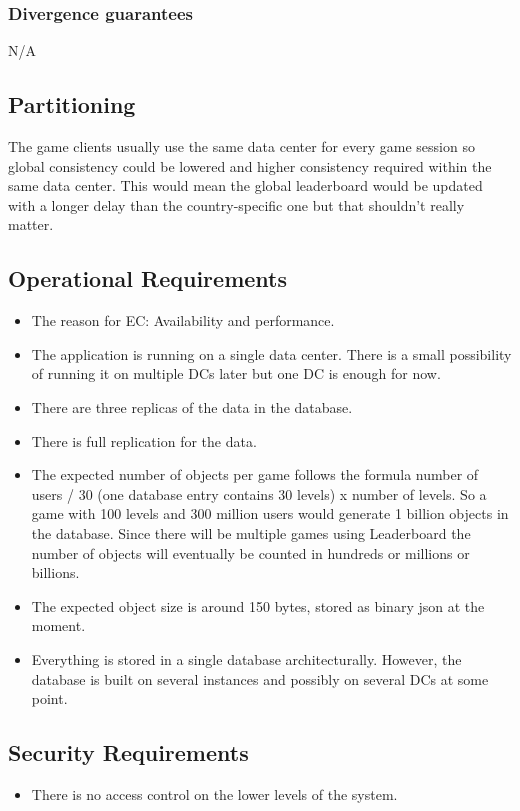 \documentclass[11pt,a4paper]{report}
\begin{document}
\subsubsection{Divergence guarantees}
N/A

\subsection{Partitioning}
The game clients usually use the same data center for every game session so global consistency could be lowered and higher consistency required within the same data center. This would mean the global leaderboard would be updated with a longer delay than the country-specific one but that shouldn't really matter.


\subsection{Operational Requirements}
\begin{itemize}
\item The reason for EC: Availability and performance.
\item The application is running on a single data center. There is a small possibility of running it on multiple DCs later but one DC is enough for now.
\item There are three replicas of the data in the database.
\item There is full replication for the data.
\item The expected number of objects per game follows the formula number of users / 30 (one database entry contains 30 levels) x number of levels. So a game with 100 levels and 300 million users would generate 1 billion objects in the database. Since there will be multiple games using Leaderboard the number of objects will eventually be counted in hundreds or millions or billions.
\item The expected object size is around 150 bytes, stored as binary json at the moment.
\item Everything is stored in a single database architecturally. However, the database is built on several instances and possibly on several DCs at some point.
\end{itemize}

\subsection{Security Requirements}
\begin{itemize}
\item There is no access control on the lower levels of the system.
\end{itemize}
\end{document}
